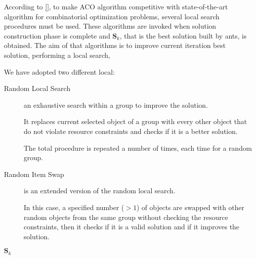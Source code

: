 \documentclass[12pt,a4paper]{report}
\begin{document}
According to \ref{}, to make ACO algorithm competitive with  state-of-the-art algorithm for combinatorial optimization problems, several local search procedures must be used. These algorithms are invoked when solution construction phase is complete and $\textbf{S}_k$, that is the best solution built by ants, is obtained. The aim of that algorithms is to improve current iteration best solution, performing a local search, 

We have adopted two different local:

\begin{description}
	\item[Random Local Search]  an exhaustive search within a group to improve the solution. 
	
	It replaces current selected object of a group with every other object that do not violate resource constraints and checks if it is a better solution. 
	
	The total procedure is repeated a number of times, each time for a random group.
	
	\item[Random Item Swap] is an extended version of the
	random local search. 
	
	In this case, a specified number ($> 1$) of objects are swapped with other random objects from the same group without checking the resource constraints, then it checks if it is a valid solution and if it improves the solution.
\end{description}

\begin{algorithm}
	
	\Return $\textbf{S}_k$
\end{algorithm}
\end{document}
